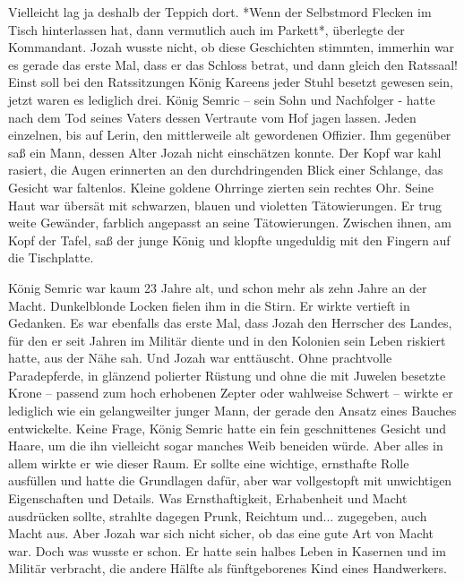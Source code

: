 Vielleicht lag ja deshalb der Teppich dort. *Wenn der Selbstmord Flecken im Tisch hinterlassen hat, 
dann vermutlich auch im Parkett*, überlegte der Kommandant. Jozah wusste nicht, ob diese Geschichten 
stimmten, immerhin war es gerade das erste Mal, dass er das Schloss betrat, und dann gleich den 
Ratssaal!
Einst soll bei den Ratssitzungen König Kareens jeder Stuhl besetzt gewesen sein, jetzt waren es 
lediglich drei. König Semric – sein Sohn und Nachfolger - hatte nach dem Tod seines Vaters dessen 
Vertraute vom Hof jagen lassen. Jeden einzelnen, bis auf Lerin, den mittlerweile alt gewordenen 
Offizier. Ihm gegenüber saß ein Mann, dessen Alter Jozah nicht einschätzen konnte. Der Kopf war kahl 
rasiert, die Augen erinnerten an den durchdringenden Blick einer Schlange, das Gesicht war 
faltenlos. Kleine goldene Ohrringe zierten sein rechtes Ohr. Seine Haut war übersät mit schwarzen, 
blauen und violetten Tätowierungen. Er trug weite Gewänder, farblich angepasst an seine 
Tätowierungen. Zwischen ihnen, am Kopf der Tafel, saß der junge König und klopfte ungeduldig mit den 
Fingern auf die Tischplatte. 

König Semric war kaum 23 Jahre alt, und schon mehr als zehn Jahre an der Macht. Dunkelblonde Locken 
fielen ihm in die Stirn. Er wirkte vertieft in Gedanken. Es war ebenfalls das erste Mal, dass Jozah 
den Herrscher des Landes, für den er seit Jahren im Militär diente und in den Kolonien sein Leben 
riskiert hatte, aus der Nähe sah. Und Jozah war enttäuscht. Ohne  prachtvolle Paradepferde, in 
glänzend polierter Rüstung und ohne die mit Juwelen besetzte Krone – passend zum hoch erhobenen 
Zepter oder wahlweise Schwert – wirkte er lediglich wie ein gelangweilter junger Mann, der gerade 
den Ansatz eines Bauches entwickelte. Keine Frage, König Semric hatte ein fein geschnittenes Gesicht 
und Haare, um die ihn vielleicht sogar manches Weib beneiden würde. Aber alles in allem wirkte er 
wie dieser Raum. Er sollte eine wichtige, ernsthafte Rolle ausfüllen und hatte die Grundlagen dafür, 
aber war vollgestopft mit unwichtigen Eigenschaften und Details. Was Ernsthaftigkeit, Erhabenheit 
und Macht ausdrücken sollte, strahlte dagegen Prunk, Reichtum und... zugegeben, auch Macht aus. Aber 
Jozah war sich nicht sicher, ob das eine gute Art von Macht war. Doch was wusste er schon. Er hatte 
sein halbes Leben in Kasernen und im Militär verbracht, die andere Hälfte als fünftgeborenes Kind 
eines Handwerkers.


